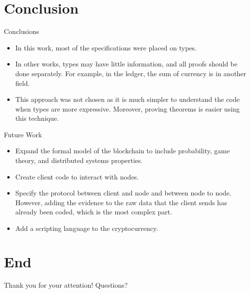 \documentclass{beamer}
\begin{document}
\section{Conclusion}

\begin{frame}{Conclusions}
  \begin{itemize}[<+->]
    \item In this work, most of the specifications were placed on types.
    \item In other works, types may have little information, and all proofs should be done separately.
      For example, in the ledger, the sum of currency is in another field.
    \item This approach was not chosen as it is much simpler to understand the code when types are more expressive.
      Moreover, proving theorems is easier using this technique.
  \end{itemize}
\end{frame}

\begin{frame}{Future Work}
  \begin{itemize}[<+->]
    \item Expand the formal model of the blockchain to include
      probability, game theory, and distributed systems properties.
    \item Create client code to interact with nodes.
    \item Specify the protocol between client and node and between node to node.
          However, adding the evidence to the raw data that the client sends has already been coded,
          which is the most complex part.
    \item Add a scripting language to the cryptocurrency.
  \end{itemize}
\end{frame}

\section{End}

\begin{frame}
  \vspace*{36 pt}
  \begin{center}
  {\Huge Thank you for your attention!}
  {\Huge \newline}
  {\Huge Questions?}
  \end{center}
\end{frame}

%   
%   
\end{document}
